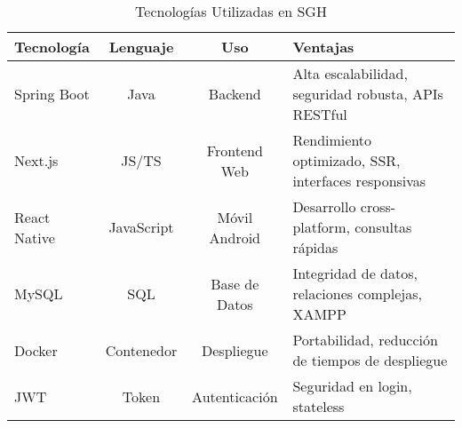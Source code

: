 \begin{table}[h]
\centering
\caption{Tecnologías Utilizadas en SGH}
\label{tab:frameworks}
\scriptsize
\begin{tabular}{lccp{3cm}}
\toprule
\textbf{Tecnología} & \textbf{Lenguaje} & \textbf{Uso} & \textbf{Ventajas} \\
\midrule
Spring Boot & Java & Backend & Alta escalabilidad, seguridad robusta, APIs RESTful \\
Next.js & JS/TS & Frontend Web & Rendimiento optimizado, SSR, interfaces responsivas \\
React Native & JavaScript & Móvil Android & Desarrollo cross-platform, consultas rápidas \\
MySQL & SQL & Base de Datos & Integridad de datos, relaciones complejas, XAMPP \\
Docker & Contenedor & Despliegue & Portabilidad, reducción de tiempos de despliegue \\
JWT & Token & Autenticación & Seguridad en login, stateless \\
\bottomrule
\end{tabular}
\end{table}